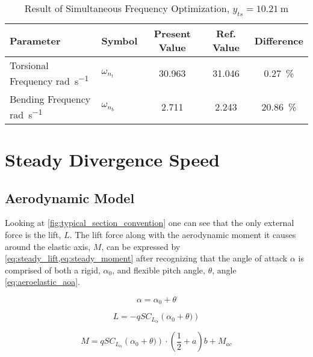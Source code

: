 \begin{table}[H]
    \centering
    \caption{Result of Simultaneous Frequency Optimization, $y_{ts} =
    \SI{10.21}{\meter}$}
    \label{tab:matched_frequencies}
    \begin{tabularx}{\textwidth}{p{}P{0.095\textwidth}CCC}
    \toprule
    \textbf{Parameter} & \textbf{Symbol} &\textbf{Present Value}
    &\textbf{Ref. Value \autocite{howcroftEfficientAeroelasticBeam2019}}
    & \textbf{Difference} \\
    \midrule
    Torsional Frequency \si{\radian\per\second}
    & $\omega_{n_t}$ & 30.963 & 31.046 & \SI{0.27}{\percent}\\
    Bending Frequency \si{\radian\per\second}
    & $\omega_{n_b}$ & 2.711 & 2.243 & \SI{20.86}{\percent}\\ \bottomrule
    \end{tabularx}
\end{table}


\section{Steady Divergence Speed}


\subsection{Aerodynamic Model}
Looking at \cref{fig:typical_section_convention} one can see that the only
external force is the lift, $L$. The lift force along with the aerodynamic
moment it causes around the elastic axis, $M$, can be expressed by
\cref{eq:steady_lift,eq:steady_moment} after recognizing that the angle of
attack $\alpha$ is comprised of both a rigid, $\alpha_0$, and flexible
pitch angle, $\theta$, angle \cref{eq:aeroelastic_aoa}.

\begin{equation}
    \label{eq:aeroelastic_aoa}
    \alpha = \alpha_0 + \theta
\end{equation}

\begin{equation}
    \label{eq:steady_lift}
    L = -qSC_{L_\alpha}\left(\alpha_0 + \theta)\right)
\end{equation}

\begin{equation}
    \label{eq:steady_moment}
    M = qSC_{L_\alpha}\left(\alpha_0 + \theta)\right)\cdot
    \left(\frac{1}{2} + a \right)b + M_{ac}
\end{equation}

